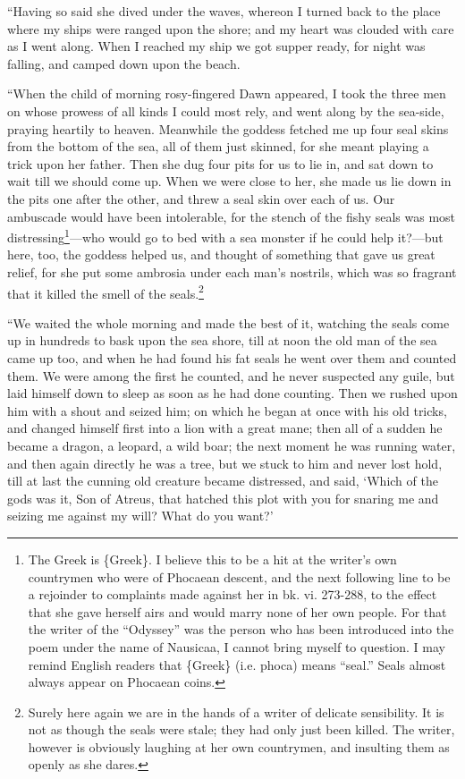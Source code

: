 “Having so said she dived under the waves, whereon I turned back to the place
where my ships were ranged upon the shore; and my heart was clouded with care
as I went along. When I reached my ship we got supper ready, for night was
falling, and camped down upon the beach.

“When the child of morning rosy-fingered Dawn appeared, I took the three men on
whose prowess of all kinds I could most rely, and went along by the sea-side,
praying heartily to heaven. Meanwhile the goddess fetched me up four seal skins
from the bottom of the sea, all of them just skinned, for she meant playing a
trick upon her father. Then she dug four pits for us to lie in, and sat down to
wait till we should come up. When we were close to her, she made us lie down in
the pits one after the other, and threw a seal skin over each of us. Our
ambuscade would have been intolerable, for the stench of the fishy seals was
most distressing\footnote{The Greek is \{Greek\}. I believe this to be a hit at the writer’s own
countrymen who were of Phocaean descent, and the next following line to be a
rejoinder to complaints made against her in bk. vi. 273-288, to the effect
that she gave herself airs and would marry none of her own people. For that
the writer of the “Odyssey” was the person who has been introduced into the
poem under the name of Nausicaa, I cannot bring myself to question. I may
remind English readers that \{Greek\} (i.e. phoca) means “seal.” Seals almost
always appear on Phocaean coins.}—who would go to bed with a sea
monster if he could help it?—but here, too, the goddess helped us, and thought
of something that gave us great relief, for she put some ambrosia under each
man’s nostrils, which was so fragrant that it killed the smell of the seals.\footnote{Surely here again we are in the hands of a writer of delicate sensibility.
It is not as though the seals were stale; they had only just been killed. The
writer, however is obviously laughing at her own countrymen, and insulting
them as openly as she dares.}

“We waited the whole morning and made the best of it, watching the seals come
up in hundreds to bask upon the sea shore, till at noon the old man of the sea
came up too, and when he had found his fat seals he went over them and counted
them. We were among the first he counted, and he never suspected any guile, but
laid himself down to sleep as soon as he had done counting. Then we rushed upon
him with a shout and seized him; on which he began at once with his old tricks,
and changed himself first into a lion with a great mane; then all of a sudden
he became a dragon, a leopard, a wild boar; the next moment he was running
water, and then again directly he was a tree, but we stuck to him and never
lost hold, till at last the cunning old creature became distressed, and said,
‘Which of the gods was it, Son of Atreus, that hatched this plot with you for
snaring me and seizing me against my will? What do you want?’

